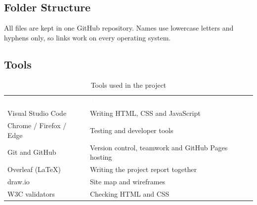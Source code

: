 \documentclass[10pt,a4paper]{article}
\newcommand{\hc}[1]{\textcolor{white}{\bfseries #1}}
\newcommand{\tbl}{\rowcolors{2}{white}{gkbg}\renewcommand{\arraystretch}{1.2}\footnotesize}
\begin{document}
\subsection{Folder Structure}
All files are kept in one GitHub repository. Names use lowercase letters and hyphens only, so links work on every operating system.
\begin{center}
\end{center}

\subsection{Tools}
\begin{table}[H]
\centering
\caption{Tools used in the project}
\tbl
\begin{tabularx}{\textwidth}{@{}lY@{}}
\hc{Tool} & \hc{Use}\\
Visual Studio Code & Writing HTML, CSS and JavaScript\\
Chrome / Firefox / Edge & Testing and developer tools\\
Git and GitHub & Version control, teamwork and GitHub Pages hosting\\
Overleaf (LaTeX) & Writing the project report together\\
draw.io & Site map and wireframes\\
W3C validators & Checking HTML and CSS\\
\end{tabularx}
\end{table}
\end{document}
